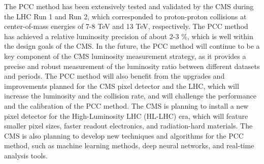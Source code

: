 
The PCC method has been extensively tested and validated by the CMS during the LHC Run 1 and Run 2, which corresponded to proton-proton collisions at center-of-mass energies of 7-8 TeV and 13 TeV, respectively. The PCC method has achieved a relative luminosity precision of about 2-3 \%, which is well within the design goals of the CMS. In the future, the PCC method will continue to be a key component of the CMS luminosity measurement strategy, as it provides a precise and robust measurement of the luminosity ratio between different datasets and periods. The PCC method will also benefit from the upgrades and improvements planned for the CMS pixel detector and the LHC, which will increase the luminosity and the collision rate, and will challenge the performance and the calibration of the PCC method. The CMS is planning to install a new pixel detector for the High-Luminosity LHC (HL-LHC) era, which will feature smaller pixel sizes, faster readout electronics, and radiation-hard materials. The CMS is also planning to develop new techniques and algorithms for the PCC method, such as machine learning methods, deep neural networks, and real-time analysis tools.

